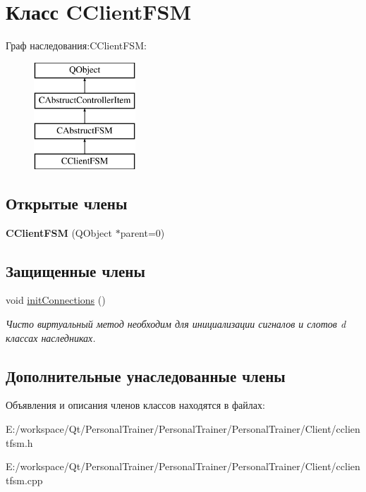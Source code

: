 \hypertarget{class_c_client_f_s_m}{}\section{Класс C\+Client\+F\+SM}
\label{class_c_client_f_s_m}
Граф наследования\+:C\+Client\+F\+SM\+:\begin{figure}[H]
\begin{center}
\leavevmode
\includegraphics[height=4.000000cm]{class_c_client_f_s_m}
\end{center}
\end{figure}
\subsection*{Открытые члены}
\begin{DoxyCompactItemize}
\item 
\hypertarget{class_c_client_f_s_m_ad5cde8ac83f83aa722a1739bdf46a453}{}\label{class_c_client_f_s_m_ad5cde8ac83f83aa722a1739bdf46a453} 
{\bfseries C\+Client\+F\+SM} (Q\+Object $\ast$parent=0)
\end{DoxyCompactItemize}
\subsection*{Защищенные члены}
\begin{DoxyCompactItemize}
\item 
\hypertarget{class_c_client_f_s_m_aaf6b857e9a5d2b2f55b71212e74fd4cb}{}\label{class_c_client_f_s_m_aaf6b857e9a5d2b2f55b71212e74fd4cb} 
void \hyperlink{class_c_client_f_s_m_aaf6b857e9a5d2b2f55b71212e74fd4cb}{init\+Connections} ()
\begin{DoxyCompactList}\small\item\em Чисто виртуальный метод необходим для инициализации сигналов и слотов d классах наследниках. \end{DoxyCompactList}\end{DoxyCompactItemize}
\subsection*{Дополнительные унаследованные члены}


Объявления и описания членов классов находятся в файлах\+:\begin{DoxyCompactItemize}
\item 
E\+:/workspace/\+Qt/\+Personal\+Trainer/\+Personal\+Trainer/\+Personal\+Trainer/\+Client/cclientfsm.\+h\item 
E\+:/workspace/\+Qt/\+Personal\+Trainer/\+Personal\+Trainer/\+Personal\+Trainer/\+Client/cclientfsm.\+cpp\end{DoxyCompactItemize}
